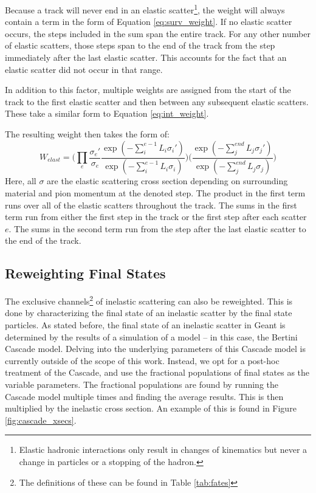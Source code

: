 \documentclass[12pt]{article}
\begin{document}
Because a track will never end in an elastic scatter\footnote{Elastic hadronic interactions only result in changes of kinematics but never a change in particles or a stopping of the hadron.}, the weight will always contain a term in the form of Equation \ref{eq:surv_weight}. If no elastic scatter occurs, the steps included in the sum span the entire track. For any other number of elastic scatters, those steps span to the end of the track from the step immediately after the last elastic scatter. This accounts for the fact that an elastic scatter did not occur in that range. 

In addition to this factor, multiple weights are assigned from the start of the track to the first elastic scatter and then between any subsequent elastic scatters. These take a similar form to Equation \ref{eq:int_weight}.

The resulting weight then takes the form of:
\begin{equation}\label{ref:elastFull}
W_{elast} = \Bigg( \prod \limits_{e} \frac{\sigma_{e}'}{\sigma_{e}} \frac{\exp(-\sum \limits_i^{e-1} L_i  \sigma_{i}')}{\exp(-\sum \limits_i^{e-1} L_i  \sigma_{i})} \Bigg)
\Bigg( \frac{\exp(-\sum \limits_j^{end} L_j \sigma_{j}')} {\exp(-\sum \limits_j^{end} L_j \sigma_{j})} \Bigg)
\end{equation}
Here, all $\sigma$ are the elastic scattering cross section depending on surrounding material and pion momentum at the denoted step. The product in the first term runs over all of the elastic scatters throughout the track. The sums in the first term run from either the first step in the track or the first step after each scatter $e$. The sums in the second term run from the step after the last elastic scatter to the end of the track.

\subsection{Reweighting Final States}\label{subsec:fs_rw}
The exclusive channels\footnote{The definitions of these can be found in Table \ref{tab:fates}} of inelastic scattering can also be reweighted. This is done by characterizing the final state of an inelastic scatter by the final state particles. As stated before, the final state of an inelastic scatter in Geant is determined by the results of a simulation of a model -- in this case, the Bertini Cascade model. Delving into the underlying parameters of this Cascade model is currently outside of the scope of this work. Instead, we opt for a post-hoc treatment of the Cascade, and use the fractional populations of final states as the variable parameters. The fractional populations are found by running the Cascade model multiple times and finding the average results. This is then multiplied by the inelastic cross section. An example of this is found in Figure \ref{fig:cascade_xsecs}.
\end{document}
